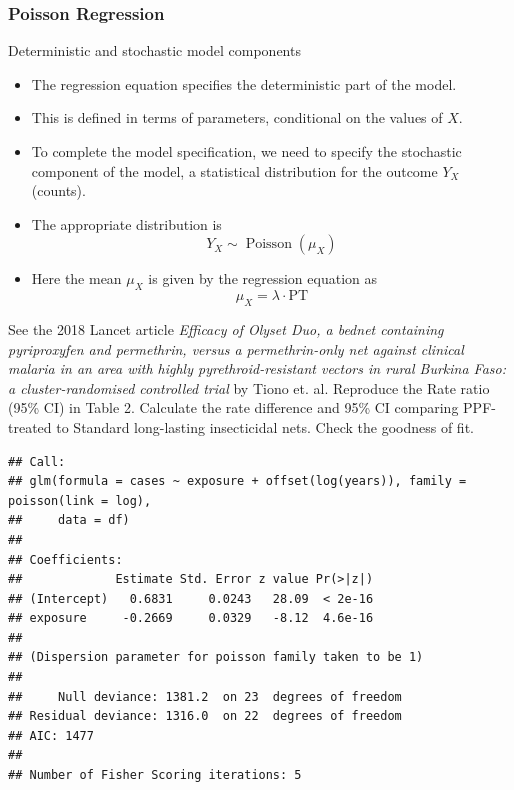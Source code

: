 \documentclass[10pt]{beamer}\usepackage[]{graphicx}\usepackage[]{color}
\makeatletter
\newenvironment{kframe}{%
 \def\at@end@of@kframe{}%
 \ifinner\ifhmode%
  \def\at@end@of@kframe{\end{minipage}}%
  \begin{minipage}{\columnwidth}%
 \fi\fi%
 \def\FrameCommand##1{\hskip\@totalleftmargin \hskip-\fboxsep
 \colorbox{shadecolor}{##1}\hskip-\fboxsep
     \hskip-\linewidth \hskip-\@totalleftmargin \hskip\columnwidth}%
 \MakeFramed {\advance\hsize-\width
   \@totalleftmargin\z@ \linewidth\hsize
   \@setminipage}}%
 {\par\unskip\endMakeFramed%
 \at@end@of@kframe}
\newenvironment{knitrout}{}{} %
\makeatother
\begin{document}
\subsubsection{Poisson Regression}
\begin{frame}{Deterministic and stochastic model components}
	\begin{itemize}
		\item 
		The regression equation specifies the deterministic part of the model.
		
		\item This is defined in terms of parameters, conditional on the values of $X$.
		
		\item To complete the model specification, we need to specify the stochastic component of the model, a statistical distribution for the outcome $Y_{X}$ (counts). 
		\item The appropriate distribution is
		$$
		Y_{X} \sim \operatorname{Poisson}\left(\mu_{X}\right)
		$$
		\item Here the mean $\mu_{X}$ is given by the regression equation as 
		$$
		\mu_{X}=\lambda \cdot \textrm{PT}
		$$
	\end{itemize}
\end{frame}

\begin{frame}
	\vspace*{-1.091in}
	\tiny
	See the 2018 Lancet article \textit{Efficacy of Olyset Duo, a bednet containing pyriproxyfen and permethrin, versus a permethrin-only net against clinical malaria in an area with highly pyrethroid-resistant vectors in rural Burkina Faso: a cluster-randomised controlled trial} by Tiono et. al. Reproduce the Rate ratio (95\% CI) in Table 2. Calculate the rate difference and 95\% CI comparing PPF-treated to Standard long-lasting insecticidal nets. Check the goodness of fit. 
	

	
	
\begin{knitrout}\tiny
{}\color{fgcolor}\begin{kframe}
\begin{verbatim}
## Call:
## glm(formula = cases ~ exposure + offset(log(years)), family = poisson(link = log), 
##     data = df)
## 
## Coefficients:
##             Estimate Std. Error z value Pr(>|z|)
## (Intercept)   0.6831     0.0243   28.09  < 2e-16
## exposure     -0.2669     0.0329   -8.12  4.6e-16
## 
## (Dispersion parameter for poisson family taken to be 1)
## 
##     Null deviance: 1381.2  on 23  degrees of freedom
## Residual deviance: 1316.0  on 22  degrees of freedom
## AIC: 1477
## 
## Number of Fisher Scoring iterations: 5
\end{verbatim}
\end{kframe}
\end{knitrout}
	
\end{frame}
\end{document}
